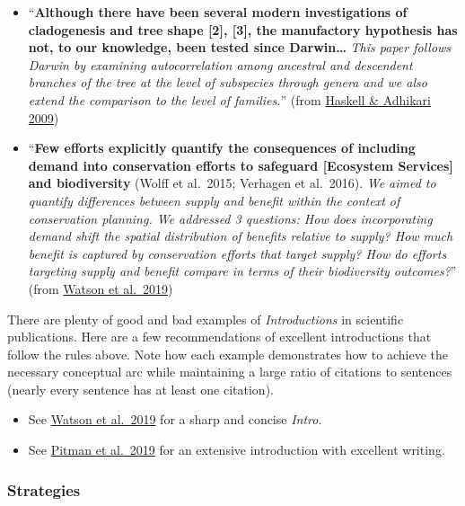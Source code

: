 \documentclass[
]{book}
\begin{document}
\begin{itemize}
\item
  ``\textbf{Although there have been several modern investigations of cladogenesis and tree shape {[}2{]}, {[}3{]}, the manufactory hypothesis has not, to our knowledge, been tested since Darwin\ldots{}} \emph{This paper follows Darwin by examining autocorrelation among ancestral and descendent branches of the tree at the level of subspecies through genera and we also extend the comparison to the level of families.}'' (from \href{https://journals.plos.org/plosone/article?id=10.1371/journal.pone.0005460}{Haskell \& Adhikari 2009})
\item
  ``\textbf{Few efforts explicitly quantify the consequences of including demand into conservation efforts to safeguard {[}Ecosystem Services{]} and biodiversity} (Wolff et al.~2015; Verhagen et al.~2016). \emph{We aimed to quantify differences between supply and benefit within the context of conservation planning. We addressed 3 questions: How does incorporating demand shift the spatial distribution of benefits relative to supply? How much benefit is captured by conservation efforts that target supply? How do efforts targeting supply and benefit compare in terms of their biodiversity outcomes?}'' (from \href{https://conbio.onlinelibrary.wiley.com/doi/full/10.1111/cobi.13276}{Watson et al.~2019})
\end{itemize}

There are plenty of good and bad examples of \emph{Introductions} in scientific publications. Here are a few recommendations of excellent introductions that follow the rules above. Note how each example demonstrates how to achieve the necessary conceptual arc while maintaining a large ratio of citations to sentences (nearly every sentence has at least one citation).

\begin{itemize}
\item
  See \href{https://conbio.onlinelibrary.wiley.com/doi/full/10.1111/cobi.13276}{Watson et al.~2019} for a sharp and concise \emph{Intro}.
\item
  See \href{https://onlinelibrary.wiley.com/doi/full/10.1111/mms.12661}{Pitman et al.~2019} for an extensive introduction with excellent writing.
\end{itemize}

\hypertarget{strategies-1}{%
\subsubsection*{Strategies}\label{strategies-1}}
\end{document}
